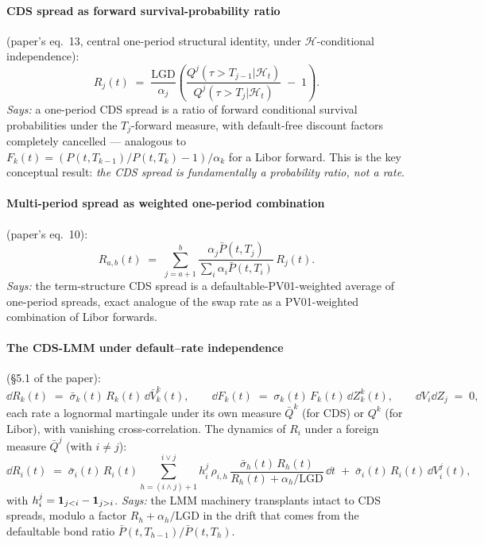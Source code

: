 \documentclass[11pt,a4paper]{article}
\begin{document}
\paragraph{CDS spread as forward survival-probability ratio}
(paper's eq.~13, central one-period structural identity, under
$\mathcal{H}$-conditional independence):
\begin{equation}\label{eq:cdsmm-onerate}
  R_j(t) \;=\; \frac{\mathrm{LGD}}{\alpha_j}
              \left( \frac{Q^j(\tau > T_{j-1} | \mathcal{H}_t)}{Q^j(\tau > T_j | \mathcal{H}_t)} \;-\; 1 \right).
\end{equation}
\textit{Says:} a one-period CDS spread is a ratio of forward
conditional survival probabilities under the $T_j$-forward measure,
with default-free discount factors completely cancelled --- analogous
to $F_k(t) = (P(t, T_{k-1})/P(t, T_k) - 1)/\alpha_k$ for a Libor
forward. This is the key conceptual result: \textit{the CDS spread
is fundamentally a probability ratio, not a rate}.

\paragraph{Multi-period spread as weighted one-period combination}
(paper's eq.~10):
\begin{equation}\label{eq:cdsmm-multi}
  R_{a,b}(t) \;=\; \sum_{j=a+1}^{b} \frac{\alpha_j \bar P(t, T_j)}{\sum_i \alpha_i \bar P(t, T_i)}\, R_j(t).
\end{equation}
\textit{Says:} the term-structure CDS spread is a defaultable-PV01-weighted
average of one-period spreads, exact analogue of the swap rate as a
PV01-weighted combination of Libor forwards.

\paragraph{The CDS-LMM under default--rate independence}
(\S5.1 of the paper):
\begin{equation}\label{eq:cdsmm-lmm}
  \dd R_k(t) \;=\; \bar\sigma_k(t)\, R_k(t)\, \dd \bar V^k_k(t),
  \qquad
  \dd F_k(t) \;=\; \sigma_k(t)\, F_k(t)\, \dd Z^k_k(t),
  \qquad
  \dd V_i \dd Z_j \;=\; 0,
\end{equation}
each rate a lognormal martingale under its own measure $\bar Q^k$
(for CDS) or $Q^k$ (for Libor), with vanishing cross-correlation.
The dynamics of $R_i$ under a foreign measure $\bar Q^j$ (with $i \ne j$):
\begin{equation}\label{eq:cdsmm-drift}
  \dd R_i(t) \;=\; \bar\sigma_i(t)\, R_i(t)
                \sum_{h=(i \wedge j)+1}^{i \vee j} h^j_i\, \rho_{i,h}\,
                \frac{\bar\sigma_h(t)\, R_h(t)}{R_h(t) + \alpha_h/\mathrm{LGD}}\, \dd t
                \;+\; \bar\sigma_i(t)\, R_i(t)\, \dd V^j_i(t),
\end{equation}
with $h^j_i = \mathbf{1}_{j<i} - \mathbf{1}_{j>i}$. \textit{Says:} the LMM
machinery transplants intact to CDS spreads, modulo a factor
$R_h + \alpha_h/\mathrm{LGD}$ in the drift that comes from the
defaultable bond ratio $\bar P(t, T_{h-1})/\bar P(t, T_h)$.
\end{document}
